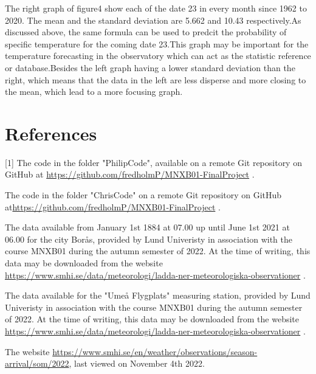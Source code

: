 \documentclass[a4, 12pt]{article}
\begin{document}
The right graph of figure4 show each of the date 23 in every month since 1962 to 2020. The mean and the standard deviation are 5.662 and 10.43 respectively.As discussed above, the same formula can be used to predcit the probability of specific temperature for the coming date 23.This graph may be important for the temperature forecasting in the observatory which can act as the statistic reference or database.Besides the left graph having a lower standard deviation than the right, which means that the data in the left are less disperse and more closing to the mean, which lead to a more focusing graph.





\newpage
\section{References}
[1] The code in the folder "PhilipCode", available on a remote Git repository on GitHub at \href{https://github.com/fredholmP/MNXB01-FinalProject}{https://github.com/fredholmP/MNXB01-FinalProject} . \newline

\noindent [2] The code in the folder "ChrisCode" on a remote Git repository on GitHub at\newline \href{https://github.com/fredholmP/MNXB01-FinalProject}{https://github.com/fredholmP/MNXB01-FinalProject} . \newline

\noindent [3] The data available from January 1st 1884 at 07.00 up until June 1st 2021 at 06.00 for the city Borås, provided by Lund Univeristy in association with the course MNXB01 during the autumn semester of 2022. At the time of writing, this data may be downloaded from the website \href{https://www.smhi.se/data/meteorologi/ladda-ner-meteorologiska-observationer}{https://www.smhi.se/data/meteorologi/ladda-ner-meteorologiska-observationer}  . \newline


\noindent [4] The data available for the "Umeå Flygplats" measuring station, provided by Lund Univeristy in association with the course MNXB01 during the autumn semester of 2022. At the time of writing, this data may be downloaded from the website \href{https://www.smhi.se/data/meteorologi/ladda-ner-meteorologiska-observationer}{https://www.smhi.se/data/meteorologi/ladda-ner-meteorologiska-observationer} . \newline

\noindent [5] The website \href{https://www.smhi.se/en/weather/observations/season-arrival/som/2022}{https://www.smhi.se/en/weather/observations/season-arrival/som/2022}, last viewed on November 4th 2022.
\end{document}
